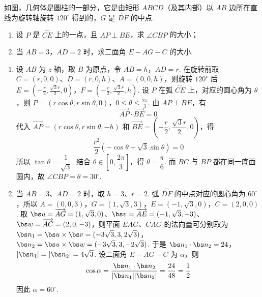 \begin{problem}
如图，几何体是圆柱的一部分，它是由矩形 \(ABCD\)（及其内部）以 \(AB\) 边所在直线为旋转轴旋转 \(120^\circ\) 得到的，\(G\) 是 \(\overset{\frown}{DF}\) 的中点.

\begin{enumerate}
\item 设 \(P\) 是 \(\overset{\frown}{CE}\) 上的一点，且 \(AP\perp BE\)，求 \(\angle CBP\) 的大小；
\item 当 \(AB=3\)，\(AD=2\) 时，求二面角 \(E-AG-C\) 的大小.
\end{enumerate}

\end{problem}

\begin{solution}
\begin{enumerate}
\item 设 \(AB\) 为 \(z\) 轴，取 \(B\) 为原点，令 \(AB=h\)，\(AD=r\). 在旋转前取 \(C=(r,0,0)\)、\(D=(r,0,h)\)、\(A=(0,0,h)\)，则旋转 \(120^\circ\) 后
\(E=\left(-\frac r2,\frac{\sqrt3r}{2},0\right)\)，\(F=\left(-\frac r2,\frac{\sqrt3r}{2},h\right)\).
设 \(P\) 在弧 \(\overset{\frown}{CE}\) 上，对应的圆心角为 \(\theta\)，则
\(P=(r\cos\theta,r\sin\theta,0)\)，\(0\leq\theta\leq\frac{2\pi}{3}\).
由 \(AP\perp BE\)，有
\[
\overrightarrow{AP}\cdot\overrightarrow{BE}=0
\]
代入 \(\overrightarrow{AP}=(r\cos\theta,r\sin\theta,-h)\) 和 \(\overrightarrow{BE}=\left(-\dfrac r2,\dfrac{\sqrt3r}{2},0\right)\)，得
\[
\frac{r^2}{2}(-\cos\theta+\sqrt3\sin\theta)=0
\]
所以 \(\tan\theta=\dfrac1{\sqrt3}\). 结合 \(\theta\in\left[0,\dfrac{2\pi}3\right]\)，得 \(\theta=\dfrac\pi6\). 而 \(BC\) 与 \(BP\) 都在同一底面圆内，故 \(\angle CBP=\theta=30^\circ\).
\item 当 \(AB=3\)、\(AD=2\) 时，取 \(h=3\)、\(r=2\). 弧 \(\overset{\frown}{DF}\) 的中点对应的圆心角为 \(60^\circ\)，所以
\(A=(0,0,3)\)，\(G=(1,\sqrt3,3)\)，\(E=(-1,\sqrt3,0)\)，\(C=(2,0,0)\).
取 \(\bs u=\overrightarrow{AG}=(1,\sqrt3,0)\)、\(\bs v=\overrightarrow{AE}=(-1,\sqrt3,-3)\)、\(\bs w=\overrightarrow{AC}=(2,0,-3)\)，则平面 \(EAG\)、\(CAG\) 的法向量可分别取为
\(\bs n_1=\bs u\times\bs v=(-3\sqrt3,3,2\sqrt3)\)，\(\bs n_2=\bs u\times\bs w=(-3\sqrt3,3,-2\sqrt3)\).
于是
\(\bs n_1\cdot\bs n_2=24\)，\(|\bs n_1|=|\bs n_2|=4\sqrt3\).
设二面角 \(E-AG-C\) 为 \(\alpha\)，则
\[
\cos\alpha=\frac{\bs n_1\cdot\bs n_2}{|\bs n_1||\bs n_2|}=\frac{24}{48}=\frac12
\]
因此 \(\alpha=60^\circ\).
\end{enumerate}
\end{solution}

